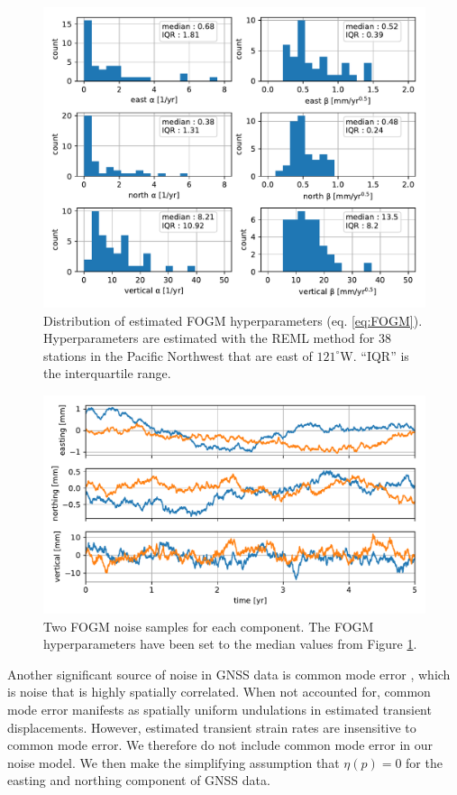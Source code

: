 \documentclass[extra,mreferee]{gji}
\begin{document}
\begin{figure}
\includegraphics{figures/noise/noise-params.pdf}
\caption{Distribution of estimated FOGM hyperparameters (eq. \ref{eq:FOGM}). Hyperparameters are estimated with the REML method for 38 stations in the Pacific Northwest that are east of $121^\circ$W. ``IQR'' is the interquartile range.}   
\label{fig:NoiseParams}
\end{figure}

\begin{figure}
\includegraphics{figures/noise/noise-samples.pdf}
\caption{Two FOGM noise samples for each component. The FOGM hyperparameters have been set to the median values from Figure \ref{fig:NoiseParams}.}   
\label{fig:NoiseSamples}
\end{figure}

Another significant source of noise in GNSS data is common mode error \citep[e.g.,][]{Wdowinski1997,Dong2006}, which is noise that is highly spatially correlated. When not accounted for, common mode error manifests as spatially uniform undulations in estimated transient displacements. However, estimated transient strain rates are insensitive to common mode error. We therefore do not include common mode error in our noise model. We then make the simplifying assumption that $\eta(p) = 0$ for the easting and northing component of GNSS data.  
\end{document}
